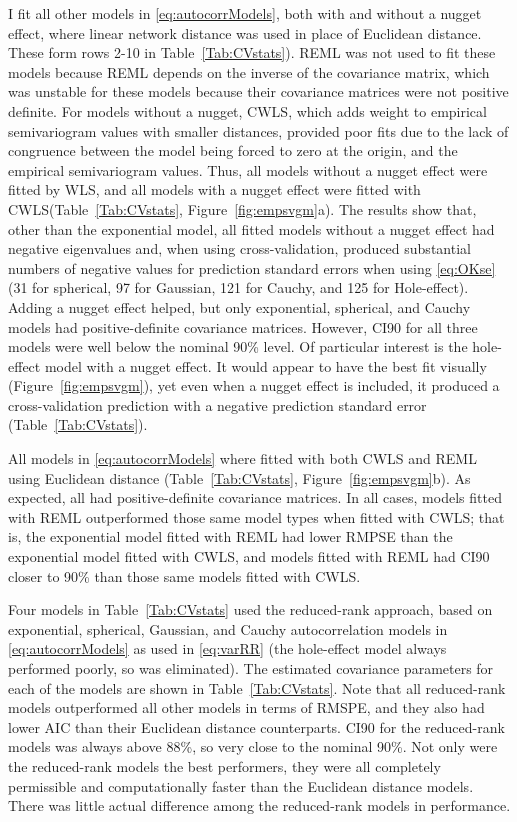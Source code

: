 \documentclass[11pt, titlepage]{article}\usepackage[]{graphicx}\usepackage[]{color}
\begin{document}
\begin{spacing}{1.9}
\begin{flushleft}
I fit all other models in \ref{eq:autocorrModels}, both with and without a nugget effect, where linear network distance was used in place of Euclidean distance.  These form rows 2-10 in Table~\ref{Tab:CVstats}). REML was not used to fit these models because REML depends on the inverse of the covariance matrix, which was unstable for these models because their covariance matrices were not positive definite. For models without a nugget, CWLS, which adds weight to empirical semivariogram values with smaller distances, provided poor fits due to the lack of congruence between the model being forced to zero at the origin, and the empirical semivariogram values.  Thus, all models without a nugget effect were fitted by WLS, and all models with a nugget effect were fitted with CWLS(Table~\ref{Tab:CVstats}, Figure~\ref{fig:empsvgm}a). The results show that, other than the exponential model, all fitted models without a nugget effect had negative eigenvalues and, when using cross-validation, produced substantial numbers of negative values for prediction standard errors when using \ref{eq:OKse} (31 for spherical, 97 for Gaussian, 121 for Cauchy, and 125 for Hole-effect).  Adding a nugget effect helped, but only exponential, spherical, and Cauchy models had positive-definite covariance matrices.  However, CI90 for all three models were well below the nominal 90\% level.  Of particular interest is the hole-effect model with a nugget effect. It would appear to have the best fit visually (Figure~\ref{fig:empsvgm}), yet even when a nugget effect is included, it produced a cross-validation prediction with a negative prediction standard error (Table~\ref{Tab:CVstats}).

All models in \ref{eq:autocorrModels} where fitted with both CWLS and REML using Euclidean distance (Table~\ref{Tab:CVstats}, Figure~\ref{fig:empsvgm}b).  As expected, all had positive-definite covariance matrices.  In all cases, models fitted with REML outperformed those same model types when fitted with CWLS; that is, the exponential model fitted with REML had lower RMPSE than the exponential model fitted with CWLS, and models fitted with REML had CI90 closer to 90\% than those same models fitted with CWLS.

Four models in Table~\ref{Tab:CVstats} used the reduced-rank approach, based on exponential, spherical, Gaussian, and Cauchy autocorrelation models in \ref{eq:autocorrModels} as used in \ref{eq:varRR} (the hole-effect model always performed poorly, so was eliminated).  The estimated covariance parameters for each of the models are shown in Table~\ref{Tab:CVstats}.  Note that all reduced-rank models outperformed all other models in terms of RMSPE, and they also had lower AIC than their Euclidean distance counterparts.  CI90 for the reduced-rank models was always above 88\%, so very close to the nominal 90\%. Not only were the reduced-rank models the best performers, they were all completely permissible and computationally faster than the Euclidean distance models.  There was little actual difference among the reduced-rank models in performance.  


\end{flushleft}
\end{spacing}
\end{document}
